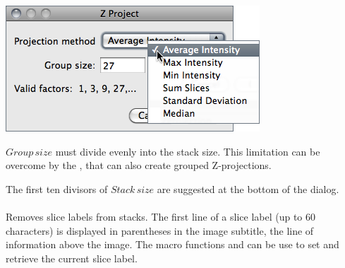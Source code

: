 \begin{minipage}[c][1\totalheight][t]{0.5\columnwidth}%
\includegraphics[scale=0.55]{images/GroupedZproject}%
\end{minipage}%
\begin{minipage}[c][1\totalheight][t]{0.5\columnwidth}%
\emph{$Group\, size$} must divide evenly into the stack size. This
limitation can be overcome by the ,
that can also create grouped Z-projections.

\medskip{}
The first ten divisors of $Stack\, size$ are suggested at the bottom
of the dialog.%
\end{minipage}




\paragraph[\protect\userinterface{Remove Slice Labels}]{\protect{}\label{sub:Remove-Slice-Labels}}

Removes slice labels from stacks. The first line of a slice label
(up to 60 characters) is displayed in parentheses in the image subtitle,
the line of information above the image. The macro functions 
and 
can be use to set and retrieve the current slice label.




\paragraph{\protect{}\label{sub:Start-Animation}}

